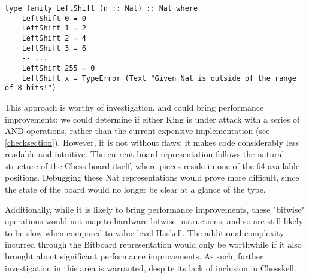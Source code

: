 \begin{lstlisting}
type family LeftShift (n :: Nat) :: Nat where
    LeftShift 0 = 0
    LeftShift 1 = 2
    LeftShift 2 = 4
    LeftShift 3 = 6
    -- ...
    LeftShift 255 = 0
    LeftShift x = TypeError (Text "Given Nat is outside of the range of 8 bits!")
\end{lstlisting}

This approach is worthy of investigation, and could bring performance improvements; we could determine if either King is under attack with a series of AND operations, rather than the current expensive implementation (see \cref{checksection}). However, it is not without flaws; it makes code considerably less readable and intuitive. The current board representation follows the natural structure of the Chess board itself, where pieces reside in one of the 64 available positions. Debugging these Nat representations would prove more difficult, since the state of the board would no longer be clear at a glance of the type.

Additionally, while it is likely to bring performance improvements, these "bitwise" operations would not map to hardware bitwise instructions, and so are still likely to be slow when compared to value-level Haskell. The additional complexity incurred through the Bitboard representation would only be worthwhile if it also brought about significant performance improvements. As such, further investigation in this area is warranted, despite its lack of inclusion in Chesskell.
